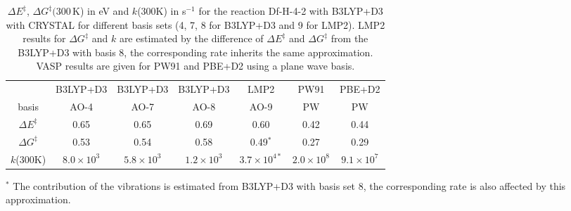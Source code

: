 \documentclass[11pt,DIV=13,BCOR=5mm,a4paper,headinclude]{scrbook}
\begin{document}
\begin{table}[!h]
  \centering
  \caption{$\Delta E^\ddagger$, $\Delta G^\ddagger(300\,$K) in eV and $k$(300K) in s$^{-1}$ for the reaction Df-H-4-2 with B3LYP+D3 with CRYSTAL for different basis sets (4, 7, 8 for B3LYP+D3 and 9 for LMP2).
  LMP2 results for $\Delta G^\ddagger$ and $k$ are estimated by the difference of $\Delta E^\ddagger$ and $\Delta G^\ddagger$ from the B3LYP+D3 with basis 8, the corresponding rate inherits the same approximation.
  VASP results are given for PW91 and PBE+D2 using a plane wave basis.}
  \begin{tabular}{c|ccc|c|cc}%
  \toprule
    & B3LYP+D3 &B3LYP+D3 &B3LYP+D3&LMP2 &PW91&PBE+D2\\
    basis&AO-4&AO-7&AO-8&AO-9&PW&PW\\\midrule
   $\Delta E^\ddagger$ &0.65 &0.65 &0.69 & 0.60&0.42&0.44\\
   $\Delta G^\ddagger$ &0.53 &0.54 &0.58 & 0.49$^\ast$ &0.27&0.29\\
   $k$(300K) &$8.0\times 10^3$ &$5.8\times 10^3$ &$1.2\times 10^3$ & $3.7\times 10^{4\ast}$&$2.0\times 10^8$ &$9.1\times 10^7$\\\bottomrule 
  \end{tabular}
  \begin{tablenotes}
 \footnotesize
\item[] $^\ast$ The contribution of the vibrations is estimated from B3LYP+D3 with basis set 8, the corresponding rate is also affected by this approximation.
\end{tablenotes}
  \label{tab:k_crystal-reopt+noopt}
\end{table}
\\
\end{document}
